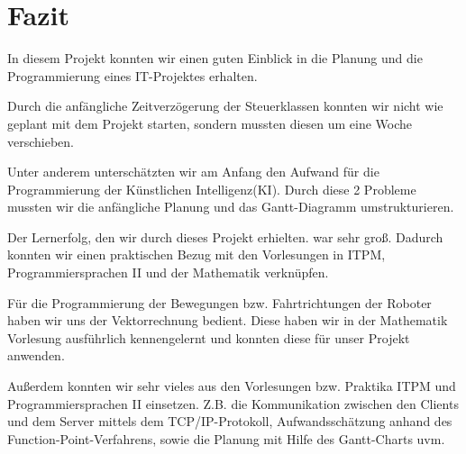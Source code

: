 \section{Fazit}
In diesem Projekt konnten wir einen guten Einblick in die Planung und die Programmierung eines IT-Projektes erhalten.

Durch die anfängliche Zeitverzögerung der Steuerklassen konnten wir nicht wie geplant mit dem Projekt starten, sondern mussten diesen um eine Woche verschieben.

Unter anderem unterschätzten wir am Anfang den Aufwand für die Programmierung der Künstlichen Intelligenz(KI).
Durch diese 2 Probleme mussten wir die anfängliche Planung und das Gantt-Diagramm umstrukturieren.

Der Lernerfolg, den wir durch dieses Projekt erhielten. war sehr groß. Dadurch konnten wir einen praktischen Bezug mit den Vorlesungen in ITPM, Programmiersprachen II und der Mathematik verknüpfen.

Für die Programmierung der Bewegungen bzw. Fahrtrichtungen der Roboter haben wir uns der Vektorrechnung bedient. Diese haben wir in der Mathematik Vorlesung ausführlich kennengelernt und konnten diese für unser Projekt anwenden.

Außerdem konnten wir sehr vieles aus den Vorlesungen bzw. Praktika ITPM und Programmiersprachen II einsetzen.
Z.B. die Kommunikation zwischen den Clients und dem Server mittels dem TCP/IP-Protokoll, Aufwandsschätzung anhand des Function-Point-Verfahrens, sowie die Planung mit Hilfe des Gantt-Charts uvm.
\newpage